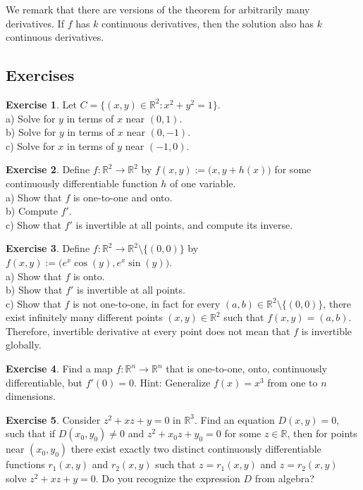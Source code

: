 \documentclass[12pt]{book}
\newcommand{\R}{{\mathbb{R}}}
\theoremstyle{plain}
\theoremstyle{remark}
\theoremstyle{definition}
\theoremstyle{exercise}
\newtheorem{exercise}{Exercise}[section]
\theoremstyle{example}
\begin{document}
We remark that there are versions of the theorem for arbitrarily many derivatives.
If $f$ has $k$ continuous derivatives, then the solution also has $k$
continuous derivatives.


\subsection{Exercises}

\begin{exercise}
Let $C = \{ (x,y) \in \R^2 : x^2+y^2 = 1 \}$. \\
a) Solve for $y$ in terms of $x$ near $(0,1)$.\\
b) Solve for $y$ in terms of $x$ near $(0,-1)$.\\
c) Solve for $x$ in terms of $y$ near $(-1,0)$.
\end{exercise}

\begin{exercise}
Define $f \colon \R^2 \to \R^2$ by $f(x,y) :=
\bigl(x,y+h(x)\bigr)$ for some continuously differentiable function $h$ of one
variable.\\
a) Show that $f$ is one-to-one and onto.\\
b) Compute $f'$.\\
c) Show that $f'$ is invertible at all points, and compute
its inverse.
\end{exercise}

\begin{exercise}
Define $f \colon \R^2 \to \R^2 \setminus \{ (0,0) \}$ by $f(x,y) :=
\bigl(e^x\cos(y),e^x\sin(y)\bigr)$.\\
a) Show that $f$ is onto.\\
b) Show that $f'$ is invertible at all points.\\
c) Show that $f$ is not one-to-one, in fact for every $(a,b) \in \R^2
\setminus \{ (0,0) \}$,
there exist infinitely many different points $(x,y) \in \R^2$ such that 
$f(x,y) = (a,b)$.\\
Therefore, invertible derivative at every point does not mean that
$f$ is invertible globally.
\end{exercise}

\begin{exercise}
Find a map $f \colon \R^n \to \R^n$ that is one-to-one, onto,
continuously differentiable, but $f'(0) = 0$.  Hint: Generalize $f(x) = x^3$ from one
to $n$ dimensions.
\end{exercise}

\begin{exercise}
Consider $z^2 + xz + y =0$ in $\R^3$.  Find an equation $D(x,y)=0$, such that
if $D(x_0,y_0) \not= 0$ and $z^2+x_0z+y_0 = 0$ for some $z \in \R$,
then for points near $(x_0,y_0)$ there exist
exactly two distinct continuously differentiable functions $r_1(x,y)$
and $r_2(x,y)$ such that $z=r_1(x,y)$ and $z=r_2(x,y)$ solve
$z^2 + xz + y =0$.  Do you recognize the expression $D$ from algebra?
\end{exercise}
\end{document}

